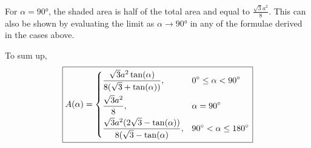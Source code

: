 \documentclass{article}
\begin{document}
\noindent
For $\alpha = \ang{90}$, the shaded area is half of the total area and equal to $\frac{\sqrt{3}a^2}{8}$. This can also be shown by evaluating the limit as $\alpha \rightarrow \ang{90}$ in any of the formulae derived in the cases above.
\medskip

\noindent
To sum up,
\[\boxed{
    A(\alpha)=
\begin{dcases}
    \frac{\sqrt{3}a^2 \tan(\alpha)}{8(\sqrt{3}+\tan(\alpha))},           & \ang{0} \leq \alpha < \ang{90} \\
    \frac{\sqrt{3}a^2}{8},                                               & \alpha = \ang{90} \\
    \frac{\sqrt{3}a^2(2\sqrt{3}-\tan(\alpha))}{8(\sqrt{3}-\tan(\alpha)}, & \ang{90} < \alpha \leq \ang{180}
\end{dcases}
}
\]
\end{document}
